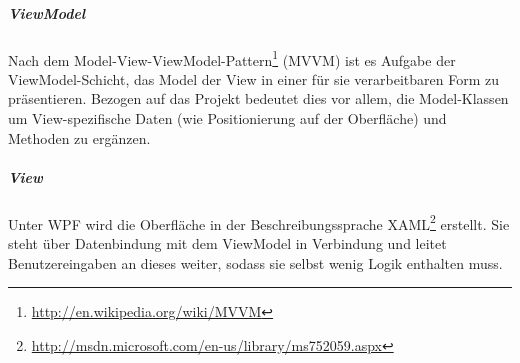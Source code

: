 \subparagraph{ViewModel} Nach dem
Model-View-ViewModel-Pattern\footnote{\url{http://en.wikipedia.org/wiki/MVVM}}
(MVVM) ist es Aufgabe der ViewModel-Schicht, das Model der View in einer für sie
verarbeitbaren Form zu präsentieren. Bezogen auf das Projekt bedeutet dies vor
allem, die Model-Klassen um View-spezifische Daten (wie Positionierung auf der
Oberfläche) und Methoden zu ergänzen.

\subparagraph{View}
Unter WPF wird die Oberfläche in der Beschreibungssprache
XAML\footnote{\url{http://msdn.microsoft.com/en-us/library/ms752059.aspx}}
erstellt. Sie steht über Datenbindung mit dem ViewModel in Verbindung und leitet
Benutzereingaben an dieses weiter, sodass sie selbst wenig Logik enthalten muss.
